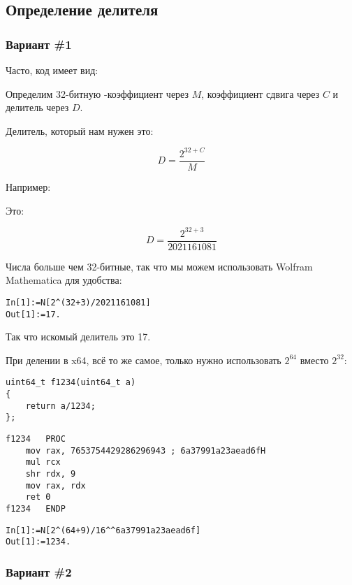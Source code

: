 ﻿\subsection{Определение делителя}

\subsubsection{Вариант \#1}

Часто, код имеет вид:



Определим 32-битную -коэффициент через $M$, коэффициент сдвига через $C$ и делитель через $D$.

Делитель, который нам нужен это:

\[
D=\frac{2^{32 + C}}{M}
\]

Например:



Это:

\[
D=\frac{2^{32 + 3}}{2021161081}
\]

Числа больше чем 32-битные, так что мы можем использовать Wolfram Mathematica для удобства:

\begin{lstlisting}[caption=Wolfram Mathematica]
In[1]:=N[2^(32+3)/2021161081]
Out[1]:=17.
\end{lstlisting}

Так что искомый делитель это 17.

При делении в x64, всё то же самое, только нужно использовать $2^{64}$ вместо $2^{32}$:

\begin{lstlisting}
uint64_t f1234(uint64_t a)
{
	return a/1234;
};
\end{lstlisting}

\begin{lstlisting}[caption=\Optimizing MSVC 2012 x64]
f1234	PROC
	mov	rax, 7653754429286296943 ; 6a37991a23aead6fH
	mul	rcx
	shr	rdx, 9
	mov	rax, rdx
	ret	0
f1234	ENDP
\end{lstlisting}

\begin{lstlisting}[caption=Wolfram Mathematica]
In[1]:=N[2^(64+9)/16^^6a37991a23aead6f]
Out[1]:=1234.
\end{lstlisting}

\subsubsection{Вариант \#2}

